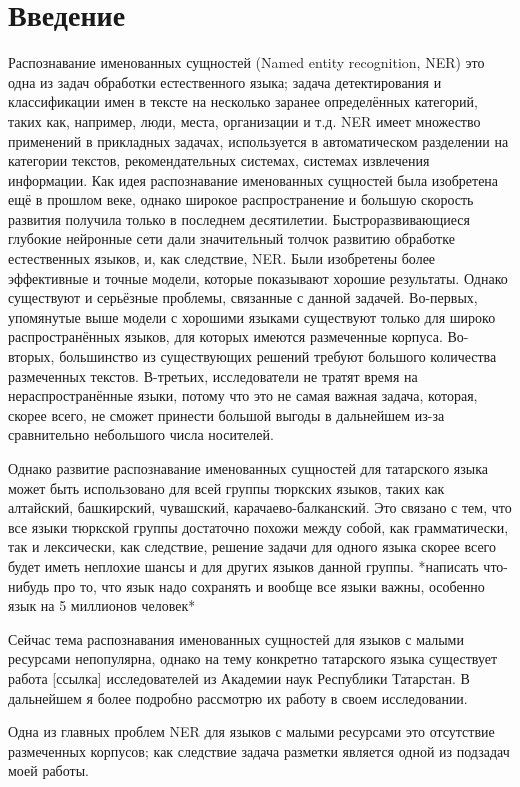 \section{Введение}

Распознавание именованных сущностей (Named entity recognition, NER) это одна из задач обработки естественного языка; задача детектирования и классификации имен в тексте на несколько заранее определённых категорий, таких как, например, люди, места, организации и т.д. NER имеет множество применений в прикладных задачах, используется в автоматическом разделении на категории текстов, рекомендательных системах, системах извлечения информации. Как идея распознавание именованных сущностей была изобретена ещё в прошлом веке, однако широкое распространение и большую скорость развития получила только в последнем десятилетии. Быстроразвивающиеся глубокие нейронные сети дали значительный толчок развитию обработке естественных языков, и, как следствие, NER. Были изобретены более эффективные и точные модели, которые показывают хорошие результаты. Однако существуют и серьёзные проблемы, связанные с данной задачей. Во-первых, упомянутые выше модели с хорошими языками существуют только для широко распространённых языков, для которых имеются размеченные корпуса. Во-вторых, большинство из существующих решений требуют большого количества размеченных текстов. В-третьих, исследователи не тратят время на нераспространённые языки, потому что это не самая важная задача, которая, скорее всего, не сможет принести большой выгоды в дальнейшем из-за сравнительно небольшого числа носителей.

Однако развитие распознавание именованных сущностей для татарского языка может быть использовано для всей группы тюркских языков, таких как алтайский, башкирский, чувашский, карачаево-балканский. Это связано с тем, что все языки тюркской группы достаточно похожи между собой, как грамматически, так и лексически, как следствие, решение задачи для одного языка скорее всего будет иметь неплохие шансы и для других языков данной группы. *написать что-нибудь про то, что язык надо сохранять и вообще все языки важны, особенно язык на 5 миллионов человек*

Сейчас тема распознавания именованных сущностей для языков с малыми ресурсами непопулярна, однако на тему конкретно татарского языка существует работа [ссылка] исследователей из Академии наук Республики Татарстан. В дальнейшем я более подробно рассмотрю их работу в своем исследовании.

Одна из главных проблем NER для языков с малыми ресурсами это отсутствие размеченных корпусов; как следствие задача разметки является одной из подзадач моей работы. 

